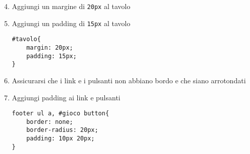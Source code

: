 \begin{frame}[fragile]\transfade
  \begin{sol}\centering
    \begin{enumerate}
      \setcounter{enumi}{3}
      \item Aggiungi un margine di \texttt{20px} al tavolo
      \item Aggiungi un padding di \texttt{15px} al tavolo
      \begin{verbatim}
#tavolo{
    margin: 20px;
    padding: 15px;
}
      \end{verbatim}
    \item Assicurarsi che i link e i pulsanti non abbiano bordo e che siano arrotondati
    \item Aggiungi padding ai link e pulsanti
    \begin{verbatim}
footer ul a, #gioco button{
    border: none;
    border-radius: 20px;
    padding: 10px 20px;
}
    \end{verbatim}
    \end{enumerate}
  \end{sol}
\end{frame}
